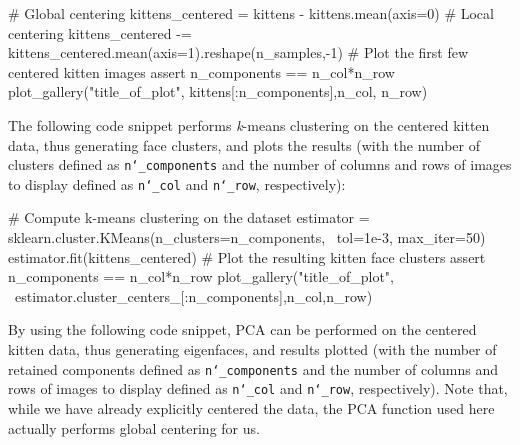\documentclass[paper=a4, fontsize=11pt]{scrartcl} %
\numberwithin{equation}{section} %
\numberwithin{figure}{section} %
\numberwithin{table}{section} %
\begin{document}
\vspace{6pt}

\begin{adjustbox}{minipage=0.8\textwidth,margin=0pt \smallskipamount,center}
\begin{python}
# Global centering
kittens_centered = kittens - kittens.mean(axis=0)
# Local centering
kittens_centered -= kittens_centered.mean(axis=1).reshape(n_samples,-1)
# Plot the first few centered kitten images
assert n_components == n_col*n_row
plot_gallery("title_of_plot", kittens[:n_components],n_col, n_row)
\end{python}
\end{adjustbox}

\vspace{6pt}

The following code snippet performs \textit{k}-means clustering on the centered kitten data, thus generating face clusters, and plots the results (with the number of clusters defined as \texttt{n\char`_components} and the number of columns and rows of images to display defined as  \texttt{n\char`_col} and  \texttt{n\char`_row}, respectively):

\vspace{6pt}

\begin{adjustbox}{minipage=0.8\textwidth,margin=0pt \smallskipamount,center}
\begin{python}
# Compute k-means clustering on the dataset
estimator = sklearn.cluster.KMeans(n_clusters=n_components, \
                                   tol=1e-3, max_iter=50)
estimator.fit(kittens_centered)
# Plot the resulting kitten face clusters
assert n_components == n_col*n_row
plot_gallery("title_of_plot", \
             estimator.cluster_centers_[:n_components],n_col,n_row)
\end{python}
\end{adjustbox}

\vspace{6pt}

By using the following code snippet, PCA can be performed on the centered kitten data, thus generating eigenfaces, and results plotted (with the number of retained components defined as \texttt{n\char`_components} and the number of columns and rows of images to display defined as  \texttt{n\char`_col} and  \texttt{n\char`_row}, respectively). Note that, while we have already explicitly centered the data, the PCA function used here actually performs global centering for us.
\end{document}
